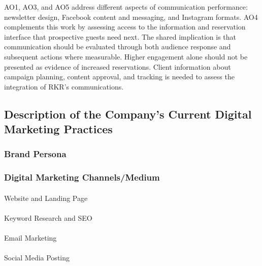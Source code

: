 \documentclass[
  12pt,
  letterpaper,
  DIV=11,
  numbers=noendperiod]{scrartcl}
\makeatletter
\let\oldparagraph\paragraph
\renewcommand{\paragraph}{
    \@ifstar
      \xxxParagraphStar
      \xxxParagraphNoStar
  }
\newcommand{\xxxParagraphStar}[1]{\oldparagraph*{#1}\mbox{}}
\newcommand{\xxxParagraphNoStar}[1]{\oldparagraph{#1}\mbox{}}
\makeatother
\begin{document}
AO1, AO3, and AO5 address different aspects of communication
performance: newsletter design, Facebook content and messaging, and
Instagram formats. AO4 complements this work by assessing access to the
information and reservation interface that prospective guests need next.
The shared implication is that communication should be evaluated through
both audience response and subsequent actions where measurable. Higher
engagement alone should not be presented as evidence of increased
reservations. Client information about campaign planning, content
approval, and tracking is needed to assess the integration of RKR's
communications.

\subsection{Description of the Company's Current Digital Marketing
Practices}\label{description-of-the-companys-current-digital-marketing-practices}

\subsubsection{Brand Persona}\label{brand-persona}

\subsubsection{Digital Marketing
Channels/Medium}\label{digital-marketing-channelsmedium}

\paragraph{Website and Landing Page}\label{website-and-landing-page}

\paragraph{Keyword Research and SEO}\label{keyword-research-and-seo}

\paragraph{Email Marketing}\label{email-marketing}

\paragraph{Social Media Posting}\label{social-media-posting}
\end{document}
